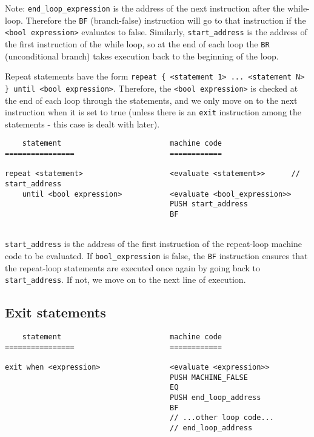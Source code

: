 \documentclass[11pt]{article}
\begin{document}
Note: \texttt{end\_loop\_expression} is the address of the next instruction after the while-loop. Therefore the \texttt{BF} (branch-false) instruction will go to that instruction if the \texttt{<bool expression>} evaluates to false. Similarly, \texttt{start\_address} is the address of the first instruction of the while loop, so at the end of each loop the \texttt{BR} (unconditional branch) takes execution back to the beginning of the loop.

Repeat statements have the form \texttt{repeat \{ <statement 1> ... <statement N> \} until <bool expression>}. Therefore, the \texttt{<bool expression>} is checked at the end of each loop through the statements, and we only move on to the next instruction when it is set to true (unless there is an \texttt{exit} instruction among the statements - this case is dealt with later).

\begin{verbatim}
    statement                         machine code
================                      ============

repeat <statement>                    <evaluate <statement>>      // start_address
    until <bool expression>           <evaluate <bool_expression>>
                                      PUSH start_address
                                      BF
    

\end{verbatim}

\texttt{start\_address} is the address of the first instruction of the repeat-loop machine code to be evaluated. If \texttt{bool\_expression} is false, the \texttt{BF} instruction ensures that the repeat-loop statements are executed once again by going back to \texttt{start\_address}. If not, we move on to the next line of execution. 
 
\subsection{Exit statements}

\begin{verbatim}
    statement                         machine code
================                      ============

exit when <expression>                <evaluate <expression>>      
                                      PUSH MACHINE_FALSE
                                      EQ
                                      PUSH end_loop_address
                                      BF
                                      // ...other loop code...
                                      // end_loop_address
           
    

\end{verbatim}
\end{document}
